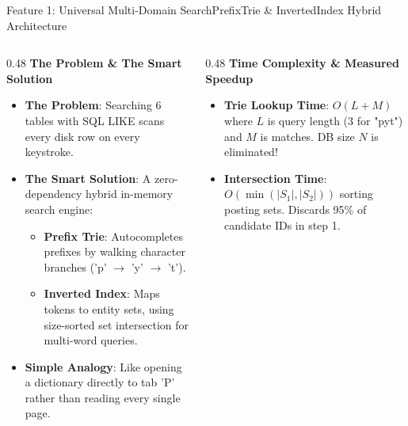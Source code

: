 \documentclass[aspectratio=169,10pt]{beamer}
\begin{document}
\begin{frame}[fragile,t]{Feature 1: Universal Multi-Domain Search}{PrefixTrie \& InvertedIndex Hybrid Architecture}
  \begin{columns}[t]
    \begin{column}{0.48\textwidth}
      {\fontsize{9.0}{11.0}\selectfont\textbf{\textcolor{KoinexaRed}{The Problem \& The Smart Solution}}}\par\vspace{1.5pt}
      \begin{itemize}\setlength{\itemsep}{1.5pt}
        \item {\fontsize{8.0}{9.8}\selectfont \textbf{The Problem}: Searching 6 tables with SQL LIKE scans every disk row on every keystroke.}
        \item {\fontsize{8.0}{9.8}\selectfont \textbf{The Smart Solution}: A zero-dependency hybrid in-memory search engine:}
        \begin{itemize}\setlength{\itemsep}{1.0pt}
          \item {\fontsize{7.5}{9.2}\selectfont \textbf{Prefix Trie}: Autocompletes prefixes by walking character branches ('p' $\to$ 'y' $\to$ 't').}
          \item {\fontsize{7.5}{9.2}\selectfont \textbf{Inverted Index}: Maps tokens to entity sets, using size-sorted set intersection for multi-word queries.}
        \end{itemize}
        \item {\fontsize{8.0}{9.8}\selectfont \textbf{Simple Analogy}: Like opening a dictionary directly to tab 'P' rather than reading every single page.}
      \end{itemize}
    \end{column}
    \begin{column}{0.48\textwidth}
      {\fontsize{9.0}{11.0}\selectfont\textbf{\textcolor{KoinexaOrange}{Time Complexity \& Measured Speedup}}}\par\vspace{1.5pt}
      \begin{itemize}\setlength{\itemsep}{1.2pt}
        \item {\fontsize{8.0}{9.8}\selectfont \textbf{Trie Lookup Time}: $O(L + M)$ where $L$ is query length (3 for "pyt") and $M$ is matches. DB size $N$ is eliminated!}
        \item {\fontsize{8.0}{9.8}\selectfont \textbf{Intersection Time}: $O(\min(|S_1|, |S_2|))$ sorting posting sets. Discards 95\% of candidate IDs in step 1.}

\end{itemize}
\end{column}
\end{columns}
\end{frame}
\end{document}
